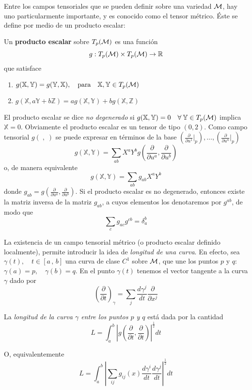 Entre los campos tensoriales que se  pueden definir sobre una variedad $\mathcal{M}$, hay
uno particularmente importante,  y es conocido como el  tensor m\'etrico. \'Este
se define por medio de un producto escalar:
%
\begin{definicion}
  Un {\bf producto escalar} sobre $T_p(\mathcal{M})$ es una funci\'on
  \[
  g: T_p(\mathcal{M}) \times T_p(\mathcal{M}) \rightarrow \mathbb{R}
  \]
  que satisface
  \begin{enumerate}
  \item $g(\mathbb{X}, \mathbb{Y}) = g(\mathbb{Y}, \mathbb{X}), \quad \text{para}
    \quad \mathbb{X}, \mathbb{Y} \in T_p(\mathcal{M})$
  \item  $g(\mathbb{X},   a  \mathbb{Y}  +  b  \mathbb{Z})   =  a  g(\mathbb{X},
    \mathbb{Y}) + b g(\mathbb{X}, \mathbb{Z})$
  \end{enumerate}
\end{definicion}

El producto escalar se dice  {\it no degenerado} si $g(\mathbb{X}, \mathbb{Y})=0
\quad \forall \:  \mathbb{Y} \in T_p(\mathcal{M})$ implica $\mathbb{X}  = 0$.  Obviamente
el  producto  escalar  es un  tensor  de  tipo  $(0,2)$.  Como  campo  tensorial
$g(\;,\;)$   se   puede   expresar    en   t\'erminos   de   la   base   $\left(
  \frac{\partial}{\partial    u^1}|_p     \right)    ,    \ldots     ,    \left(
  \frac{\partial}{\partial u^n}|_p \right)$
%
\[
g(\mathbb{X}, \mathbb{Y})  = \sum_{ab} X^a  Y^b g\left( \frac{\partial}{\partial
    u^a}, \frac{\partial}{\partial u^b} \right)
\]
%
o, de manera equivalente
%
\[
g(\mathbb{X}, \mathbb{Y}) = \sum_{ab} g_{ab} X^a Y^b
\]
%
donde     $g_{ab}    =    g     \left(    \frac{\partial}{\partial     u^a}    ,
  \frac{\partial}{\partial  u^b}   \right)$.  Si  el  producto   escalar  es  no
degenerado, entonces  existe la  matriz inversa de  la matriz $g_{ab}$,  a cuyos
elementos los denotaremos por $g^{ab}$, de modo que
%
\[
\sum_c g_{ac} g^{cb} = \delta_a^b
\]

La  existencia de  un campo  tensorial  m\'etrico (o  producto escalar  definido
localmente),  permite introducir  la idea  de {\it  longitud de  una  curva}. En
efecto, sea  $\gamma(t), \quad t  \in [a \,  , \, b]$  una curva de  clase $C^1$
sobre $\mathcal{M}$,  que une los  puntos $p$  y $q$: $\gamma(a)  = p, \quad  \gamma(b) =
q$. En el punto $\gamma(t)$ tenemos  el vector tangente a la curva $\gamma$ dado
por
%
\[
\left( \frac{\partial}{\partial t} \right)_\gamma = \sum_j \frac{d \gamma^j}{dt}
\frac{\partial}{\partial x^j}
\]

\begin{definicion}
  La {\it longitud de la curva $\gamma$  entre los puntos $p$ y $q$} est\'a dada
  por la cantidad
  \begin{equation}
    L = \int_a^b | g \left( \frac{\partial}{\partial t}, \frac{\partial}{\partial t} \right) |^{\frac{1}{2}} dt
  \label{longitud}
  \end{equation}
\end{definicion}
%
O, equivalentemente
%
\begin{equation}
L = \int_a^b \left| \sum_{ij} g_{ij}(x) \frac{d\gamma^i}{dt} \frac{d \gamma^j
}{dt} \right|^{\frac{1}{2}} dt \label{longitud}
\end{equation}